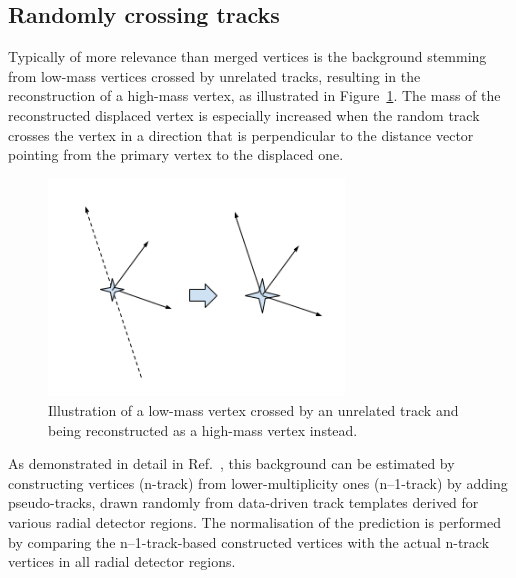 \subsection{Randomly crossing tracks} %

Typically of more relevance than merged vertices is the background stemming from low-mass vertices crossed by unrelated tracks, resulting in the reconstruction of a high-mass vertex, as illustrated in Figure~\ref{fig:randomcrossing}. The mass of the reconstructed displaced vertex is especially increased when the random track crosses the vertex in a direction that is perpendicular to the distance vector pointing from the primary vertex to the displaced one.

\begin{figure}[h]
  \centering
  \includegraphics[width=0.7\textwidth]{figures/randomcrossing.png}
  \caption{Illustration of a low-mass vertex crossed by an unrelated track and being reconstructed as a high-mass vertex instead.}
  \label{fig:randomcrossing}
\end{figure}

As demonstrated in detail in Ref.~\cite{Aaboud:2017iio,Aad:2015rba}, this background can be estimated by constructing vertices (n-track) from lower-multiplicity ones (n--1-track) by adding pseudo-tracks, drawn randomly from data-driven track templates derived for various radial detector regions. The normalisation of the prediction is performed by comparing the n--1-track-based constructed vertices with the actual n-track vertices in all radial detector regions.

